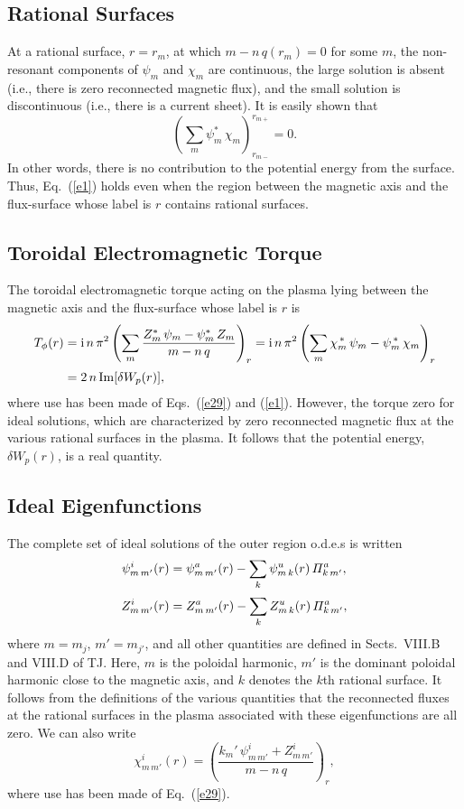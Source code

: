 \documentclass[12pt,prb,aps,notitlepage]{revtex4-1}
\begin{document}
\subsection{Rational Surfaces}
At a rational surface, $r=r_m$, at which $m-n\,q(r_m)=0$ for some $m$, the non-resonant components of $\psi_m$ and $\chi_m$ are continuous, the 
large solution is absent (i.e., there is zero reconnected magnetic flux), and the small solution is discontinuous (i.e., there is a current sheet). It is easily shown that 
\begin{equation}
\left(\sum_m\psi_m^\ast\,\chi_m\right)_{r_{m-}}^{r_{m+}}=0.
\end{equation}
In other words, there is no contribution to the potential energy from the surface. Thus, Eq.~(\ref{e1}) holds even when the region between the
magnetic axis and the flux-surface whose label is $r$ contains rational surfaces. 

\subsection{Toroidal Electromagnetic Torque}
The toroidal electromagnetic torque acting on the plasma lying between the magnetic axis and the flux-surface whose label is $r$ is
\begin{align}
T_\phi(r)& = {\rm i}\,n\,\pi^2\left(\sum_m\frac{Z_m^\ast\,\psi_m-\psi_m^\ast\,Z_m}{m-n\,q}\right)_{r}= {\rm i}\,n\,\pi^2\left(\sum_m
\chi_m^{\,\ast}\,\psi_m - \psi_m^{\,\ast}\,\chi_m\right)_r\nonumber\\[0.5ex]
&= 2\,n\,{\rm Im}[\delta W_p(r)],
\end{align}
where use has been made of Eqs.~(\ref{e29}) and (\ref{e1}). 
However, the torque zero for ideal solutions, which are characterized by zero reconnected magnetic flux at the various rational surfaces in the plasma.
It follows that
 the potential energy, $\delta W_p(r)$, is a real quantity. 

\subsection{Ideal Eigenfunctions}
The complete set of ideal solutions of the outer region o.d.e.s is written
\begin{align}
\psi_{m\,m'}^i(r)&= \psi_{m\,m'}^a(r)-\sum_{k}\psi_{m\,k}^u(r)\,{\mit\Pi}_{k\,m'}^a,\\[0.5ex]
Z_{m\,m'}^i(r)&= Z_{m\,m'}^a(r)-\sum_{k}Z_{m\,k}^u(r)\,{\mit\Pi}_{k\,m'}^a,
\end{align}
where $m=m_j$, $m'=m_{j'}$, and all other quantities are defined in Sects.~VIII.B and VIII.D of TJ. 
Here, $m$ is the poloidal harmonic,  $m'$ is the dominant poloidal harmonic close to the magnetic axis, and $k$ denotes the $k$th rational surface. It follows
from the definitions of the various quantities that the reconnected fluxes at the rational surfaces in the plasma
associated with these eigenfunctions are all zero. We can also write
\begin{equation}\label{e39}
\chi^i_{m\,m'}(r) = \left(\frac{k_{m}'\,\psi^i_{m\,m'}+Z_{m\,m'}^i}{m-n\,q}\right)_r,
\end{equation}
where use has been made of Eq.~(\ref{e29}).
\end{document}
